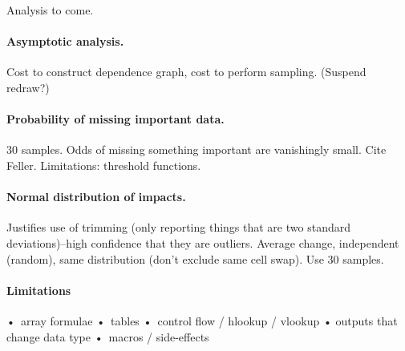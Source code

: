 Analysis to come.

\paragraph{Asymptotic analysis.}

Cost to construct dependence graph, cost to perform sampling. (Suspend redraw?)

\paragraph{Probability of missing important data.}

30 samples. Odds of missing something important are vanishingly small.
Cite Feller. Limitations: threshold functions.

\paragraph{Normal distribution of impacts.}

Justifies use of trimming (only reporting things that are two standard
deviations)--high confidence that they are outliers.  Average change,
independent (random), same distribution (don't exclude same cell
swap). Use 30 samples.

\paragraph{Limitations}

• array formulae
• tables
• control flow / hlookup / vlookup
• outputs that change data type
• macros / side-effects